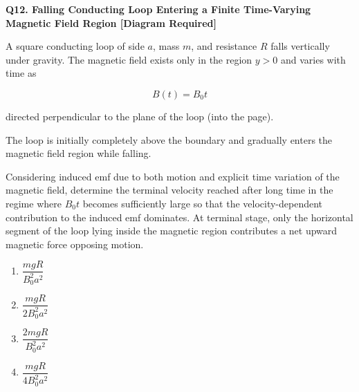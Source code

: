 \documentclass[12pt]{article}
\begin{document}

\textbf{Q12. Falling Conducting Loop Entering a Finite Time-Varying Magnetic Field Region [Diagram Required]}

A square conducting loop of side $a$, mass $m$, and resistance $R$ falls vertically under gravity. The magnetic field exists only in the region $y>0$ and varies with time as  

\[
B(t)=B_0 t
\]

directed perpendicular to the plane of the loop (into the page).  

The loop is initially completely above the boundary and gradually enters the magnetic field region while falling.

Considering induced emf due to both motion and explicit time variation of the magnetic field, determine the terminal velocity reached after long time in the regime where $B_0 t$ becomes sufficiently large so that the velocity-dependent contribution to the induced emf dominates.
At terminal stage, only the horizontal segment of the loop lying inside the magnetic region contributes a net upward magnetic force opposing motion.

\begin{center}
\end{center}

\begin{enumerate}
\item[(A)] $\dfrac{mgR}{B_0^2a^2}$
\item[(B)] $\dfrac{mgR}{2B_0^2a^2}$
\item[(C)] $\dfrac{2mgR}{B_0^2a^2}$
\item[(D)] $\dfrac{mgR}{4B_0^2a^2}$
\end{enumerate}
\end{document}
